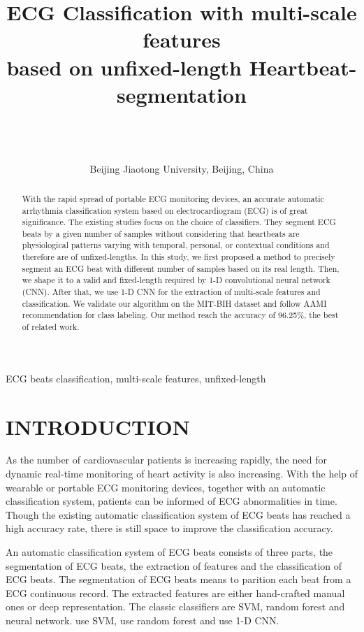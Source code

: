 \documentclass[wcp]{jmlr}
\title{ECG Classification with multi-scale features \\ based on unfixed-length Heartbeat-segmentation}
\author{\Name{Bin Chen} \Email{16120044@bjtu.edu.cn}\\
   \Name{Yuchun Guo} \Email{ychguo@bjtu.edu.cn}\\
   \Name{Yishuai Chen} \Email{yschen@bjtu.edu.cn}\\
   \addr Beijing Jiaotong University, Beijing, China}
\begin{document}
\maketitle

\begin{abstract}
With the rapid spread of portable ECG monitoring devices, an accurate automatic arrhythmia classification system based on electrocardiogram (ECG) is of great significance. The existing studies focus on the choice of classifiers. They segment ECG beats by a given number of samples without considering that heartbeats are physiological patterns varying with temporal, personal, or contextual conditions and therefore are of unfixed-lengths. In this study, we first proposed a method to precisely segment an ECG beat with different number of samples based on its real length. Then, we shape it to a valid and fixed-length required by 1-D convolutional neural network (CNN). After that, we use 1-D CNN for the extraction of multi-scale features and classification. We validate our algorithm on the MIT-BIH dataset and follow AAMI recommendation for class labeling. Our method reach the accuracy of 96.25\%, the best of related work.
\end{abstract}
\begin{keywords}
ECG beats classification, multi-scale features, unfixed-length
\end{keywords}


\section{INTRODUCTION}
As the number of cardiovascular patients is increasing rapidly, the need for dynamic real-time monitoring of heart activity is also increasing. With the help of wearable or portable ECG monitoring devices, together with an automatic classification system, patients can be informed of ECG abnormalities in time. Though the existing automatic classification system of ECG beats has reached a high accuracy rate, there is still space to improve the classification accuracy.


An automatic classification system of ECG beats consists of three parts, the segmentation of ECG beats, the extraction of features and the classification of ECG beats. The segmentation of ECG beats means to parition each beat from a ECG continuous record. The extracted features are either hand-crafted manual ones or deep representation. The classic classifiers are SVM, random forest and neural network. \cite{raj2017ecg} use SVM,  \cite{li2016ecg} use random forest and \cite{hong2017encase} use 1-D CNN.
\end{document}
